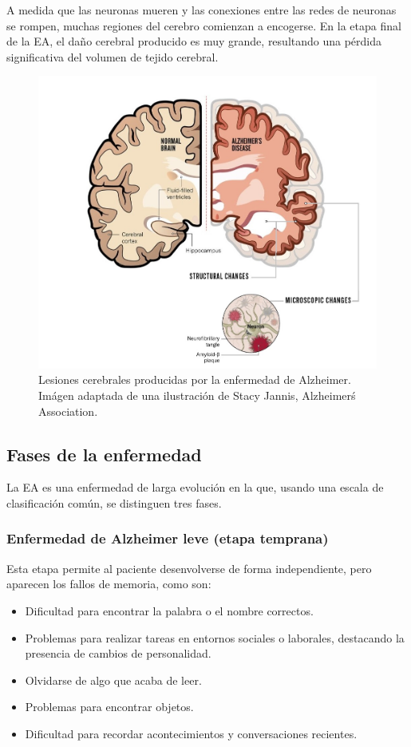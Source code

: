 A medida que las neuronas mueren y las conexiones entre las redes de neuronas se rompen, muchas regiones del cerebro
comienzan a encogerse.
En la etapa final de la EA, el daño cerebral producido es muy grande, resultando una pérdida significativa del volumen
de tejido cerebral.

\begin{figure}[H]
    \centering
    \includegraphics[width=\textwidth]{./imgs/lesiones-cerebrales}
    \caption{Lesiones cerebrales producidas por la enfermedad de Alzheimer.\\Imágen adaptada de una
    ilustración de Stacy Jannis, Alzheimer\'s Association.}
    \label{fig:lesiones-cerebrales}
\end{figure}

\subsection{Fases de la enfermedad}\label{subsec:fases-enfermedad}
La EA es una enfermedad de larga evolución en la que, usando una escala de clasificación común, se distinguen tres fases.

\subsubsection{Enfermedad de Alzheimer leve (etapa temprana)}\label{subsubsec:etapa-temprana-EA}
Esta etapa permite al paciente desenvolverse de forma independiente, pero aparecen los fallos de memoria, como son:
\begin{itemize}
    \item Dificultad para encontrar la palabra o el nombre correctos.
    \item Problemas para realizar tareas en entornos sociales o laborales, destacando la presencia de cambios de
    personalidad.
    \item Olvidarse de algo que acaba de leer.
    \item Problemas para encontrar objetos.
    \item Dificultad para recordar acontecimientos y conversaciones recientes.\\
\end{itemize}

